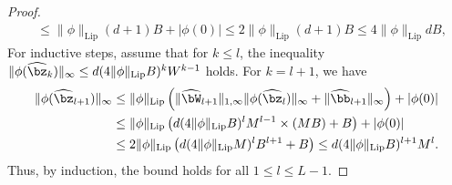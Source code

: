 \documentclass[11pt]{article}
\begin{document}
\begin{proof}
\begin{equation*}
\begin{aligned}
            & \leq \|\phi\|_{\mathrm{Lip}}(d+1) B + |\phi(0)|  \leq 2 \|\phi\|_{\mathrm{Lip}}(d+1)B \leq 4 \|\phi\|_{\mathrm{Lip}} d B,
        \end{aligned}
    \end{equation*}
    For inductive steps, assume that for $k \leq l$, the inequality $\| \phi (\widehat{\bz}_k)\|_{\infty} \leq d(4 \|\phi\|_{\mathrm{Lip}}B)^{k} W^{k-1}$ holds. For $k = l+1$, we have 
    \begin{equation*}
        \begin{aligned}
            \| \phi (\widehat{\bz}_{l+1})\|_{\infty} & \leq \|\phi\|_{\mathrm{Lip}} \left( \| \widehat{\bW}_{l+1}\|_{1, \infty} \| \phi (\widehat{\bz}_l)\|_{\infty} + \|\widehat{\bb}_{l+1}\|_{\infty}\right) + |\phi(0)|  \\
            & \leq \|\phi\|_{\mathrm{Lip}} \left( d(4 \|\phi\|_{\mathrm{Lip}} B)^{l} M^{l-1} \times (MB) + B \right)  + |\phi(0)| \\
            & \leq 2 \|\phi\|_{\mathrm{Lip}} \left( d(4 \|\phi\|_{\mathrm{Lip}} M)^{l} B^{l+1} + B \right) \leq d (4 \|\phi\|_{\mathrm{Lip}} B)^{l+1} M^{l}.
        \end{aligned}
    \end{equation*}
    Thus, by induction, the bound holds for all $1 \leq l \leq L-1$. 
    


\end{proof}
\end{document}
